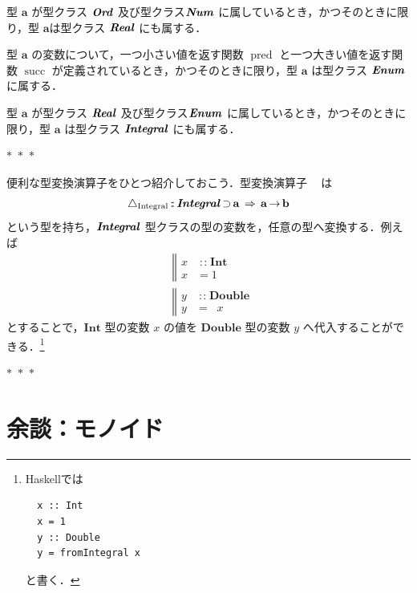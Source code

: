\documentclass[a5paper,twoside,fleqn,draft]{jsbook}
\newcommand{\TK}[1]{\mask{\textbf{TK:}~#1}{C}}
\newcommand{\separator}{\begin{center}$*$~$*$~$*$\end{center}}
\newcommand{\programminglanguage}[1]{\textsf{#1}}
\newcommand{\haskell}{\programminglanguage{Haskell}}
\newcommand{\mBrace}{\Vert}
\DeclareMathOperator{\mSuperClass}{\;\Rightarrow\;}
\DeclareMathOperator{\mSuperSet}{\supset}
\newcommand{\mUpCast}{\bigtriangleup}
\DeclareMathOperator{\mFromIntegral}{\mUpCast_\text{Integral}}
\newcommand{\mSpecialFunc}[1]{\mathrm{#1}}
\DeclareMathOperator{\mPred}{\mSpecialFunc{pred}}
\DeclareMathOperator{\mSucc}{\mSpecialFunc{succ}}
\DeclareMathOperator{\mFuncArrow}{\rightarrow}
\DeclareMathOperator{\mIn}{{:\!:}}
\newcommand{\mType}[1]{\mathbf{#1}} %
\newcommand{\mA}{\mType{a}}
\newcommand{\mB}{\mType{b}}
\newcommand{\mBoolType}{\mType{Bool}}
\newcommand{\mDoubleType}{\mType{Double}}
\newcommand{\mIntType}{\mType{Int}}
\newcommand{\mTypeClass}[1]{\textbf{\textit{#1}}}
\newcommand{\mEnumTypeClass}{\mTypeClass{Enum}}
\newcommand{\mEqTypeClass}{\mTypeClass{Eq}}
\newcommand{\mIntegralTypeClass}{\mTypeClass{Integral}}
\newcommand{\mNumTypeClass}{\mTypeClass{Num}}
\newcommand{\mOrdTypeClass}{\mTypeClass{Ord}}
\newcommand{\mRealTypeClass}{\mTypeClass{Real}}
\begin{document}
型 $\mA$ が型クラス $\mOrdTypeClass$ 及び型クラス$\mNumTypeClass$ に属しているとき，かつそのときに限り，型 $\mA$は型クラス $\mRealTypeClass$ にも属する．

型 $\mA$ の変数について，一つ小さい値を返す関数 $\mPred$ と一つ大きい値を返す関数 $\mSucc$ が定義されているとき，かつそのときに限り，型 $\mA$ は型クラス $\mEnumTypeClass$ に属する．

型 $\mA$ が型クラス $\mRealTypeClass$ 及び型クラス$\mEnumTypeClass$ に属しているとき，かつそのときに限り，型 $\mA$ は型クラス $\mIntegralTypeClass$ にも属する．


\separator

便利な型変換演算子をひとつ紹介しておこう．型変換演算子
$\mFromIntegral$ は
\begin{equation}
  \mFromIntegral
  \mIn{}\mIntegralTypeClass\mSuperSet\mA
  \mSuperClass\mA\mFuncArrow\mB
\end{equation}
という型を持ち，$\mIntegralTypeClass$ 型クラスの型の変数を，任意の型へ変換する．例えば
\begin{align}
  {}
  &\left\mBrace
  \begin{aligned}
    x
    &\mIn\mIntType\\
    x
    &=1
  \end{aligned}
  \right.\\
        {}
        &\left\mBrace
        \begin{aligned}
          y
          &\mIn\mDoubleType\\
          y
          &=\mFromIntegral x
        \end{aligned}
        \right.
\end{align}
とすることで，$\mIntType$ 型の変数 $x$ の値を $\mDoubleType$ 型の変数 $y$ へ代入することができる．\footnote{\haskell では
\begin{verbatim}
  x :: Int
  x = 1
  y :: Double
  y = fromIntegral x
\end{verbatim}
と書く．}

\separator

\TK{種}

\section{余談：モノイド}
\end{document}
